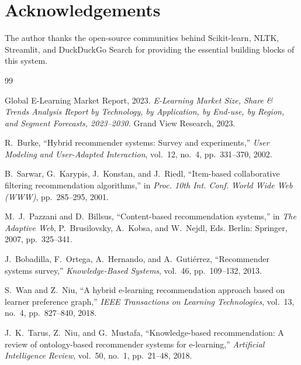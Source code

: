 \documentclass[12pt, a4paper]{article}
\begin{document}
\section*{Acknowledgements}

The author thanks the open-source communities behind Scikit-learn, NLTK, Streamlit, and DuckDuckGo
Search for providing the essential building blocks of this system.

\begin{thebibliography}{99}

Global E-Learning Market Report, 2023.
\textit{E-Learning Market Size, Share \& Trends Analysis Report by Technology, by Application,
by End-use, by Region, and Segment Forecasts, 2023--2030.}
Grand View Research, 2023.

R.~Burke,
``Hybrid recommender systems: Survey and experiments,''
\textit{User Modeling and User-Adapted Interaction}, vol.~12, no.~4, pp.~331--370, 2002.

B.~Sarwar, G.~Karypis, J.~Konstan, and J.~Riedl,
``Item-based collaborative filtering recommendation algorithms,''
in \textit{Proc. 10th Int. Conf. World Wide Web (WWW)}, pp.~285--295, 2001.

M.~J.~Pazzani and D.~Billsus,
``Content-based recommendation systems,''
in \textit{The Adaptive Web}, P.~Brusilovsky, A.~Kobsa, and W.~Nejdl, Eds.
Berlin: Springer, 2007, pp.~325--341.

J.~Bobadilla, F.~Ortega, A.~Hernando, and A.~Guti\'{e}rrez,
``Recommender systems survey,''
\textit{Knowledge-Based Systems}, vol.~46, pp.~109--132, 2013.

S.~Wan and Z.~Niu,
``A hybrid e-learning recommendation approach based on learner preference graph,''
\textit{IEEE Transactions on Learning Technologies}, vol.~13, no.~4, pp.~827--840, 2018.

J.~K.~Tarus, Z.~Niu, and G.~Mustafa,
``Knowledge-based recommendation: A review of ontology-based recommender systems for
e-learning,''
\textit{Artificial Intelligence Review}, vol.~50, no.~1, pp.~21--48, 2018.


\end{thebibliography}
\end{document}

